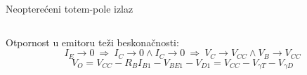 \begin{frame}[label=10-s058]{Neopterećeni totem-pole izlaz}
\setlength{\abovedisplayskip}{4pt}\setlength{\belowdisplayskip}{4pt}\setlength{\abovedisplayshortskip}{3pt}\setlength{\belowdisplayshortskip}{3pt}
\begin{columns}[T,onlytextwidth]\centering \end{columns}\medskip
Otpornost u emitoru teži beskonačnosti:
\[I_E\to0\ \Rightarrow\ I_C\to0\land I_C\to0\ \Rightarrow\ V_C\to V_{CC}\land V_B\to V_{CC}\]
\[V_O=V_{CC}-R_BI_{B1}-V_{BE1}-V_{D1}=V_{CC}-V_{\gamma T}-V_{\gamma D}\]
\end{frame}

